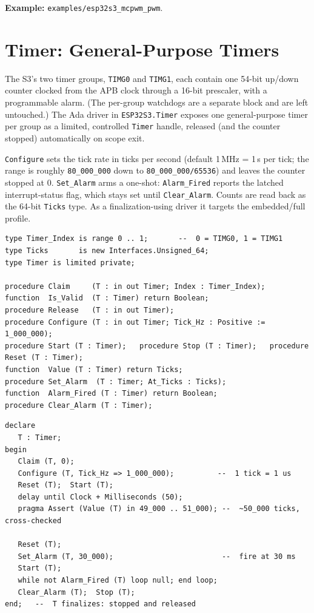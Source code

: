 \noindent\textbf{Example:} \texttt{examples/esp32s3\_mcpwm\_pwm}.

\section{Timer: General-Purpose Timers}
\label{app:int:timer}

The S3's two timer groups, \texttt{TIMG0} and \texttt{TIMG1}, each contain one
54-bit up/down counter clocked from the APB clock through a 16-bit prescaler,
with a programmable alarm. (The per-group watchdogs are a separate block and are
left untouched.) The Ada driver in \texttt{ESP32S3.Timer} exposes one
general-purpose timer per group as a limited, controlled \texttt{Timer} handle,
released (and the counter stopped) automatically on scope exit.

\texttt{Configure} sets the tick rate in ticks per second (default 1\,MHz =
1\,\textmu{}s per tick; the range is roughly \texttt{80\_000\_000} down to
\texttt{80\_000\_000/65536}) and leaves the counter stopped at 0.
\texttt{Set\_Alarm} arms a one-shot: \texttt{Alarm\_Fired} reports the latched
interrupt-status flag, which stays set until \texttt{Clear\_Alarm}. Counts are
read back as the 64-bit \texttt{Ticks} type. As a finalization-using driver it
targets the embedded/full profile.

\begin{lstlisting}
type Timer_Index is range 0 .. 1;       --  0 = TIMG0, 1 = TIMG1
type Ticks       is new Interfaces.Unsigned_64;
type Timer is limited private;

procedure Claim     (T : in out Timer; Index : Timer_Index);
function  Is_Valid  (T : Timer) return Boolean;
procedure Release   (T : in out Timer);
procedure Configure (T : in out Timer; Tick_Hz : Positive := 1_000_000);
procedure Start (T : Timer);   procedure Stop (T : Timer);   procedure Reset (T : Timer);
function  Value (T : Timer) return Ticks;
procedure Set_Alarm  (T : Timer; At_Ticks : Ticks);
function  Alarm_Fired (T : Timer) return Boolean;
procedure Clear_Alarm (T : Timer);
\end{lstlisting}

\begin{lstlisting}
declare
   T : Timer;
begin
   Claim (T, 0);
   Configure (T, Tick_Hz => 1_000_000);          --  1 tick = 1 us
   Reset (T);  Start (T);
   delay until Clock + Milliseconds (50);
   pragma Assert (Value (T) in 49_000 .. 51_000); --  ~50_000 ticks, cross-checked

   Reset (T);
   Set_Alarm (T, 30_000);                         --  fire at 30 ms
   Start (T);
   while not Alarm_Fired (T) loop null; end loop;
   Clear_Alarm (T);  Stop (T);
end;   --  T finalizes: stopped and released
\end{lstlisting}

